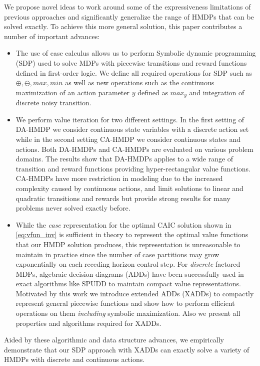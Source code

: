 \documentclass[twoside,11pt]{article}
\begin{document}
We propose novel ideas to work around some of the expressiveness limitations of previous approaches and significantly generalize the range of HMDPs that can be solved exactly.  To achieve this more general solution, this
paper contributes a number of important advances:
\begin{itemize}
\item The use of case calculus allows us to perform Symbolic dynamic programming (SDP) \cite{fomdp} used to solve MDPs with
piecewise transitions and reward functions defined in first-order logic. We define all required operations for SDP such as $\oplus,\ominus,max,min$ as well as new operations such as the continuous maximization of an action parameter $y$ defined as $max_y$ and integration of discrete noisy transition.
\item We perform value iteration for two different settings. In the first setting of DA-HMDP we consider continuous state variables with a discrete action set while in the second setting CA-HMDP we consider continuous states and actions. Both DA-HMDPs and CA-HMDPs are evaluated on various problem domains. The results show that DA-HMDPs applies to a wide range of transition and reward functions providing hyper-rectangular value functions. CA-HMDPs have more restriction in modeling due to the increased complexity caused by continuous actions, and limit solutions to linear and quadratic transitions and rewards but provide strong results for many problems never solved exactly before. 
\item While the \emph{case} representation for the optimal \textsc{CAIC} 
solution shown in \eqref{eq:vfun_inv} is sufficient in theory to
represent the optimal value functions that our HMDP solution
produces, this representation is unreasonable to maintain in practice
since the number of case partitions may grow exponentially on
each receding horizon control step.  For \emph{discrete} factored
MDPs, algebraic decision diagrams (ADDs) \cite{bahar93add} have been
successfully used in exact algorithms like SPUDD \cite{spudd} to
maintain compact value representations.  Motivated by this work we
introduce extended ADDs (XADDs) to compactly represent general
piecewise functions and show how to perform efficient operations on
them \emph{including} symbolic maximization.  Also we present all properties and algorithms required for XADDs. 
\end{itemize}

Aided by these algorithmic and data structure advances, we empirically demonstrate that our SDP approach with XADDs can exactly solve a variety of HMDPs with discrete and continuous actions. 
\end{document}
